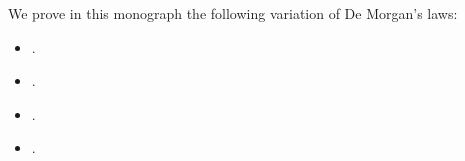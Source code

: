 \begin{remark}\label{rem:de_morgans_laws}
  We prove in this monograph the following variation of De Morgan's laws:
  \begin{itemize}
    \item {}.
    \item {}.
    \item {}.
    \item {}.
  \end{itemize}
\end{remark}
